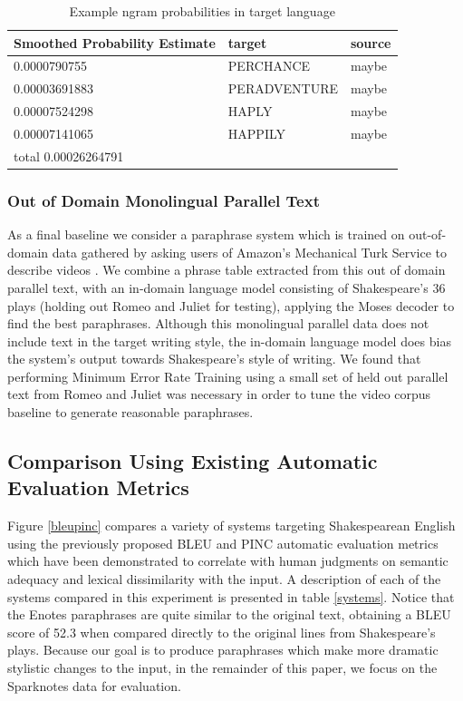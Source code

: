 \documentclass[10pt,a5paper,twoside]{article}
\begin{document}
\begin{table}
  \begin{center}
  \begin{tabular}{|l|l|l|}
    \hline
    Smoothed Probability Estimate & target & source \\
    \hline
    \hline
    0.0000790755 & PERCHANCE & maybe \\
    \hline
    0.00003691883 & PERADVENTURE & maybe \\
    \hline
    0.00007524298 & HAPLY & maybe \\
    \hline
    0.00007141065 & HAPPILY & maybe \\
    \hline
    \hline
    total 0.00026264791 & & \\
    \hline
  \end{tabular}
  \end{center}
  \caption{Example ngram probabilities in target language}
  \label{word_frequency}
\end{table}

\subsubsection{Out of Domain Monolingual Parallel Text}
As a final baseline we consider a paraphrase system which is trained on out-of-domain data gathered by asking users of Amazon's Mechanical Turk Service 
\cite{Snow08} to describe videos \cite{chen11}.  We combine a phrase table extracted from this out of domain parallel text, with an in-domain
language model consisting of Shakespeare's 36 plays (holding out Romeo and Juliet for testing), applying the Moses decoder \cite{Koehn07} to find the best paraphrases. 
Although this monolingual parallel data does not include text in the target writing style,
the in-domain language model does bias the system's output towards Shakespeare's style of writing.
We found that performing Minimum Error Rate Training using a small set of held out parallel text from Romeo and Juliet was necessary in order to tune the
video corpus baseline to generate reasonable paraphrases.

\subsection{Comparison Using Existing Automatic Evaluation Metrics}
Figure \ref{bleupinc} compares a variety of systems targeting Shakespearean English using the previously proposed BLEU \cite{Papineni02} and PINC \cite{chen11} automatic evaluation metrics which
have been demonstrated to correlate with human judgments on semantic adequacy and lexical dissimilarity with the input.
A description of each of the systems compared in this experiment is presented in table \ref{systems}.  Notice that the Enotes paraphrases are quite similar to the original text,
obtaining a BLEU score of 52.3 when compared directly to the original lines from Shakespeare's plays.  Because our goal is to produce paraphrases which make more dramatic stylistic changes to the input,
in the remainder of this paper, we focus on the Sparknotes data for evaluation.
\end{document}
